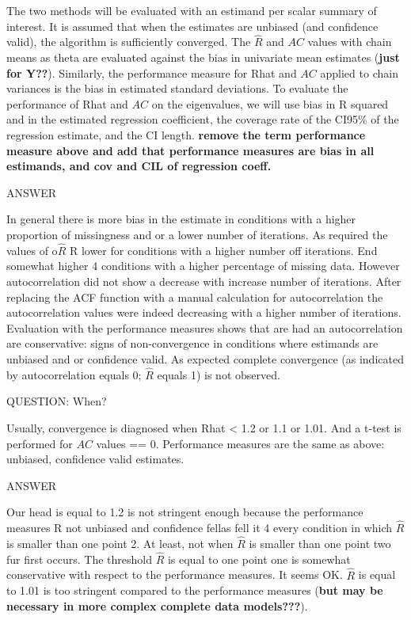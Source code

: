 \documentclass[Royal,times,sageh]{sagej}
\begin{document}
The two methods will be evaluated with an estimand per scalar summary of
interest. It is assumed that when the estimates are unbiased (and
confidence valid), the algorithm is sufficiently converged. The
\(\widehat{R}\) and \(AC\) values with chain means as theta are
evaluated against the bias in univariate mean estimates (\textbf{just
for Y??}). Similarly, the performance measure for Rhat and \(AC\)
applied to chain variances is the bias in estimated standard deviations.
To evaluate the performance of Rhat and \(AC\) on the eigenvalues, we
will use bias in R squared and in the estimated regression coefficient,
the coverage rate of the CI95\% of the regression estimate, and the CI
length. \textbf{remove the term performance measure above and add that
performance measures are bias in all estimands, and cov and CIL of
regression coeff.}

ANSWER

In general there is more bias in the estimate in conditions with a
higher proportion of missingness and or a lower number of iterations. As
required the values of o\(\widehat{R}\) R lower for conditions with a
higher number off iterations. End somewhat higher 4 conditions with a
higher percentage of missing data. However autocorrelation did not show
a decrease with increase number of iterations. After replacing the ACF
function with a manual calculation for autocorrelation the
autocorrelation values were indeed decreasing with a higher number of
iterations. Evaluation with the performance measures shows that are had
an autocorrelation are conservative: signs of non-convergence in
conditions where estimands are unbiased and or confidence valid. As
expected complete convergence (as indicated by autocorrelation equals 0;
\(\widehat{R}\) equals 1) is not observed.

QUESTION: When?

Usually, convergence is diagnosed when Rhat \textless{} 1.2 or 1.1 or
1.01. And a t-test is performed for \(AC\) values == 0. Performance
measures are the same as above: unbiased, confidence valid estimates.

ANSWER

Our head is equal to 1.2 is not stringent enough because the performance
measures R not unbiased and confidence fellas fell it 4 every condition
in which \(\widehat{R}\) is smaller than one point 2. At least, not when
\(\widehat{R}\) is smaller than one point two fur first occurs. The
threshold \(\widehat{R}\) is equal to one point one is somewhat
conservative with respect to the performance measures. It seems OK.
\(\widehat{R}\) is equal to 1.01 is too stringent compared to the
performance measures (\textbf{but may be necessary in more complex
complete data models???}).
\end{document}
